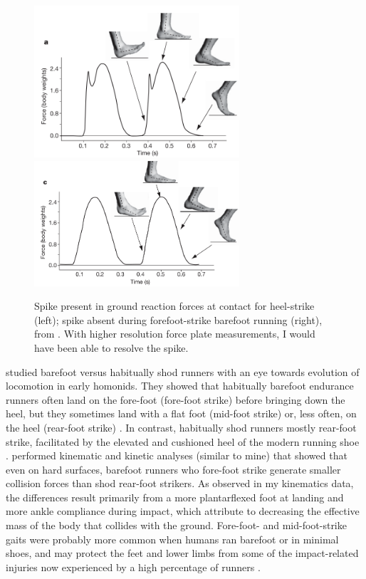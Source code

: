 \begin{figure}
\begin{center}
\includegraphics[width=3in]{figures/lieberman1.png}
\includegraphics[width=3in]{figures/lieberman2.png}
\end{center}
\caption{Spike present in ground reaction forces at contact for heel-strike (left); spike absent during forefoot-strike barefoot running (right), from \citep{lieberman2010foot}. With higher resolution force plate measurements, I would have been able to resolve the spike.}
\label{fig:discussion}
\end{figure}

\citet{lieberman2010foot} studied barefoot versus habitually shod runners with an eye towards evolution of locomotion in early homonids. They showed that habitually barefoot endurance runners often land on the fore-foot (fore-foot strike) before bringing down the heel, but they sometimes land with a flat foot (mid-foot strike) or, less often, on the heel (rear-foot strike) \citep{lieberman2010foot}. In contrast, habitually shod runners mostly rear-foot strike, facilitated by the elevated and cushioned heel of the modern running shoe \citep{lieberman2010foot}. \citet{lieberman2010foot} performed kinematic and kinetic analyses (similar to mine) that showed that even on hard surfaces, barefoot runners who fore-foot strike generate smaller collision forces than shod rear-foot strikers. As observed in my kinematics data, the differences result primarily from a more plantarflexed foot at landing and more ankle compliance during impact, which \citet{lieberman2010foot} attribute to decreasing the effective mass of the body that collides with the ground. Fore-foot- and mid-foot-strike gaits were probably more common when humans ran barefoot or in minimal shoes, and may protect the feet and lower limbs from some of the impact-related injuries now experienced by a high percentage of runners \citep{lieberman2010foot}.

